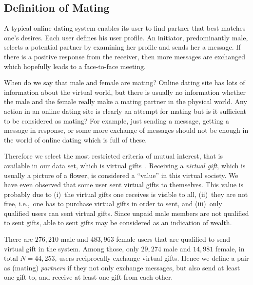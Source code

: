 \documentclass[journal,comsoc]{IEEEtran}
\newcommand{\hbie}{i.e.,}
\newcommand{\hbIdea}[1]{{\color{red}{\scriptsize [{#1}]}}}
\begin{document}
\subsection{Definition of Mating}

\hbIdea{online dating} %
A typical online dating system enables its user to 
find partner that best matches one's desires.
Each user defines his user profile.
An initiator, predominantly male, 
selects a potential partner by examining her profile and 
sends her a message.
If there is a positive response from the receiver, 
then more messages are exchanged
which hopefully leads to a face-to-face meeting.

\hbIdea{partner criteria} %
When do we say that male and female are mating?
Online dating site has lots of information about the virtual world, 
but there is usually no information whether 
the male and the female really make a mating partner in the physical world.
Any action in an online dating site is clearly an attempt for mating
but is it sufficient to be considered as mating?
For example,
just sending a message,
getting a message in response, 
or 
some more exchange of messages 
should not be enough in the world of online dating which is full of these.

Therefore we select  
the most restricted criteria of mutual interest, 
that is available in our data set,
which is virtual gifts~\cite{Bingol2012PartnerArxiv}.
Receiving a \emph{virtual gift}, 
which is usually a picture of a flower, 
is considered  a ``value'' in this virtual society.
We have even observed that some user sent virtual gifts to themselves.
This value is probably due to
(i)~the virtual gifts one receives is visible to all,
(ii)~they are not free, 
\hbie\ one has to purchase virtual gifts in order to sent, and
(iii)~only qualified users can sent virtual gifts.
Since unpaid male members are not qualified to sent gifts, 
able to sent gifts may be considered as an indication of wealth.

There are $276,210$ male and 
$483,963$ female users that are qualified to send virtual gift in the system. 
Among those, only 
$29,274$ male and 
$14,981$ female,
in total $N = 44,253$, 
users reciprocally exchange virtual gifts.
Hence we define a pair as (mating) \emph{partners} if
they not only exchange messages, 
but also 
send at least one gift to, 
and 
receive at least one gift from each other.
\end{document}
